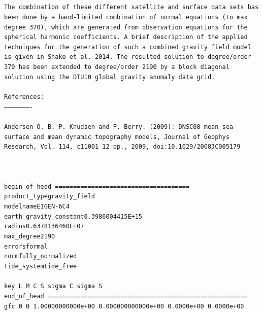 \documentclass[a4paper, 12pt]{book}
\begin{document}
\texttt{\\
\\
\noindent The combination of these different satellite and surface data sets 
has been done by a band-limited combination of normal equations (to max degree 
370), which are generated from observation equations for the spherical harmonic 
coefficients. A brief description of the applied techniques for the generation 
of such a combined gravity field model is given in Shako et al. 2014. The 
resulted solution to degree/order 370 has been extended to degree/order 2190 by 
a block diagonal solution using the DTU10 global gravity anomaly data grid.
\\
\\
\noindent References:\\
\noindent ----------------------
\\
\\
\noindent Andersen O. B. P. Knudsen and P. Berry. (2009): DNSC08 mean sea 
surface and mean dynamic topography models, Journal of Geophys Research, 
Vol. 114, c11001 12 pp., 2009, doi:10.1029/2008JC005179
\\
\\
\noindent [...]
\\
\\
\noindent begin\_of\_head =====================================\\
\noindent product\_type\phantom{***************}gravity\_field\\
\noindent modelname\phantom{******************}EIGEN-6C4\\
\noindent earth\_gravity\_constant\phantom{*****}0.3986004415E+15\\
\noindent radius\phantom{*********************}0.6378136460E+07\\
\noindent max\_degree\phantom{*****************}2190\\
\noindent errors\phantom{*********************}formal\\
\noindent norm\phantom{***********************}fully\_normalized\\
\noindent tide\_system\phantom{****************}tide\_free\\
\\
\noindent key    L    M \phantom{-}C \phantom{-------------------------------}S 
\phantom{----------------------------------}sigma C   \phantom{------}sigma S\\
\noindent end\_of\_head 
=======================================================\\
\noindent gfc    0    0  \phantom{-}1.00000000000e+00 0.000000000000e+00 0.0000e+00 0.0000e+00\\
}
\end{document}
